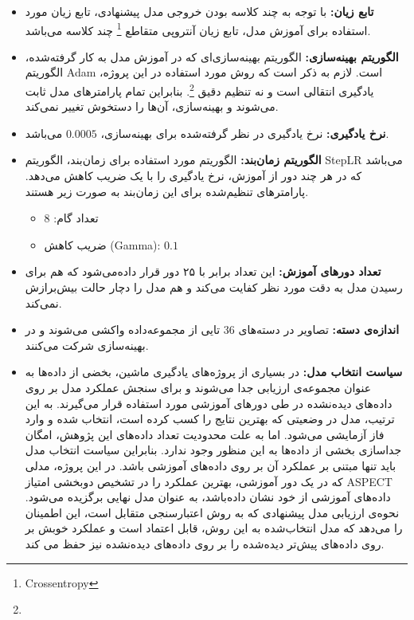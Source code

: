 \begin{itemize}
    \item \textbf{تابع زیان:} با توجه به چند کلاسه بودن خروجی مدل پیشنهادی، تابع زیان مورد استفاده برای آموزش مدل، تابع زیان آنتروپی متقاطع
    \footnote{Crossentropy}
    چند کلاسه می‌باشد.
    \item \textbf{الگوریتم بهینه‌سازی:} الگوریتم بهینه‌سازی‌ای که در آموزش مدل به کار گرفته‌شده، الگوریتم Adam است.
    لازم به ذکر است که روش مورد استفاده در این پروژه، یادگیری انتقالی است و نه تنظیم دقیق \footnote{}. بنابراین تمام پارامتر‌های مدل  ثابت می‌شوند و بهینه‌سازی، آن‌ها را دستخوش تغییر نمی‌کند.
    \item \textbf{نرخ یادگیری:} نرخ یادگیری در نظر گرفته‌شده برای بهینه‌سازی، $0.0005$ می‌باشد.
    \item \textbf{الگوریتم زمان‌بند:} الگوریتم مورد استفاده برای زمان‌بند، الگوریتم StepLR می‌باشد که در هر چند دور از آموزش، نرخ یادگیری را با یک ضریب کاهش می‌دهد. پارامتر‌های تنظیم‌شده برای این زمان‌بند به صورت زیر هستند.
    \begin{itemize}
        \item تعداد گام: 8
        \item ضریب کاهش (Gamma): $0.1$
    \end{itemize}
    \item \textbf{تعداد دور‌های آموزش:} این تعداد برابر با ۲۵ دور قرار داده‌می‌شود که هم برای رسیدن مدل به دقت مورد نظر کفایت می‌کند و هم مدل را دچار حالت بیش‌برازش نمی‌کند.
    \item \textbf{اندازه‌ی دسته:} تصاویر در دسته‌های 36 تایی از مجموعه‌داده واکشی می‌شوند و در بهینه‌سازی شرکت می‌کنند.
    \item \textbf{سیاست انتخاب مدل:} در بسیاری از پروژه‌های یادگیری ماشین، بخضی از داده‌ها به عنوان مجموعه‌ی ارزیابی جدا می‌شوند و برای سنجش عملکرد مدل بر روی داده‌های دیده‌نشده در طی دور‌های آموزشی مورد استفاده قرار می‌گیرند.
    به این ترتیب، مدل در وضعیتی که بهترین نتایج را کسب کرده است، انتخاب شده و وارد فاز آزمایشی می‌شود.
    اما به علت محدودیت تعداد داده‌های این پژوهش، امگان جداسازی بخشی از داده‌ها به این منظور وجود ندارد.
    بنابراین سیاست انتخاب مدل باید تنها مبتنی بر عملکرد آن بر روی داده‌های آموزشی باشد.
    در این پروژه، مدلی که در یک دور آموزشی، بهترین عملکرد را در تشخیص دوبخشی امتیاز ASPECT داده‌های آموزشی از خود نشان داده‌باشد، به عنوان مدل نهایی برگزیده می‌شود.
    نحوه‌ی ارزیابی مدل پیشنهادی که به روش اعتبارسنجی متقابل است، این اطمینان را می‌دهد که مدل انتخاب‌شده به این روش، قابل اعتماد است و عملکرد خوبش بر روی داده‌های پیش‌تر دیده‌شده را بر روی داده‌های دیده‌نشده نیز حفظ می کند.
\end{itemize}


